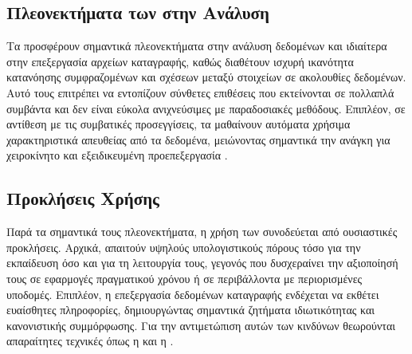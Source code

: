 \subsection{Πλεονεκτήματα των  στην Ανάλυση}

Τα  προσφέρουν σημαντικά πλεονεκτήματα στην ανάλυση δεδομένων και ιδιαίτερα στην επεξεργασία αρχείων καταγραφής, καθώς διαθέτουν ισχυρή ικανότητα κατανόησης συμφραζομένων και σχέσεων μεταξύ στοιχείων σε ακολουθίες δεδομένων. Αυτό τους επιτρέπει να εντοπίζουν σύνθετες επιθέσεις που εκτείνονται σε πολλαπλά συμβάντα και δεν είναι εύκολα ανιχνεύσιμες με παραδοσιακές μεθόδους. Επιπλέον, σε αντίθεση με τις συμβατικές προσεγγίσεις, τα  μαθαίνουν αυτόματα χρήσιμα χαρακτηριστικά απευθείας από τα δεδομένα, μειώνοντας σημαντικά την ανάγκη για χειροκίνητο  και εξειδικευμένη προεπεξεργασία \cite{brown2020language}.

\subsection{Προκλήσεις Χρήσης }

Παρά τα σημαντικά τους πλεονεκτήματα, η χρήση των  συνοδεύεται από ουσιαστικές προκλήσεις. Αρχικά, απαιτούν υψηλούς υπολογιστικούς πόρους τόσο για την εκπαίδευση όσο και για τη λειτουργία τους, γεγονός που δυσχεραίνει την αξιοποίησή τους σε εφαρμογές πραγματικού χρόνου ή σε περιβάλλοντα με περιορισμένες υποδομές. Επιπλέον, η επεξεργασία δεδομένων καταγραφής ενδέχεται να εκθέτει ευαίσθητες πληροφορίες, δημιουργώντας σημαντικά ζητήματα ιδιωτικότητας και κανονιστικής συμμόρφωσης. Για την αντιμετώπιση αυτών των κινδύνων θεωρούνται απαραίτητες τεχνικές όπως η  και η  \cite{xu2021privacy}.